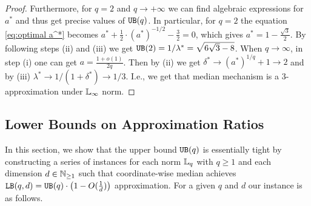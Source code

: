 \begin{proof}
Furthermore, for $q=2$ and $q\to+\infty$ we can find algebraic expressions for $a^*$ and thus get precise values of $\UB(q)$. In particular, for $q=2$ the equation \eqref{eq:optimal a^*} becomes $a^*+\frac{1}{2}\cdot (a^*)^ {-1/2}-\frac{3}{2}=0$, which gives $a^*=1-\frac{\sqrt{3}}{2}$. By following steps (ii) and (iii) we get $\UB(2)=1/\lambda^*=\sqrt{6\sqrt{3}-8}$.
When $q\rightarrow\infty$, in step (i) one can get $a=\frac{1+o(1)}{2q}$. Then by (ii) we get $\delta^*\rightarrow (a^*)^{1/q}+1\rightarrow 2$ and by (iii) $\lambda^*\rightarrow 1/(1+\delta^*)\rightarrow 1/3$. I.e., we get that median mechanism is a $3$-approximation under $\lqnorm[\infty]$ norm.
\end{proof}

\subsection{Lower Bounds on Approximation Ratios}
\label{sec:lower_global}
In this section, we show that the upper bound $\UB(q)$ is essentially tight by constructing a series of instances for each norm $\lqnorm$ with $q\ge 1$ and each dimension $d\in\nats_{\ge 1}$ such that coordinate-wise median achieves $\LB(q,d)=\UB(q)\cdot\left(1-O(\frac{1}{d})\right)$ approximation. For a given $q$ and $d$ our instance is as follows.

